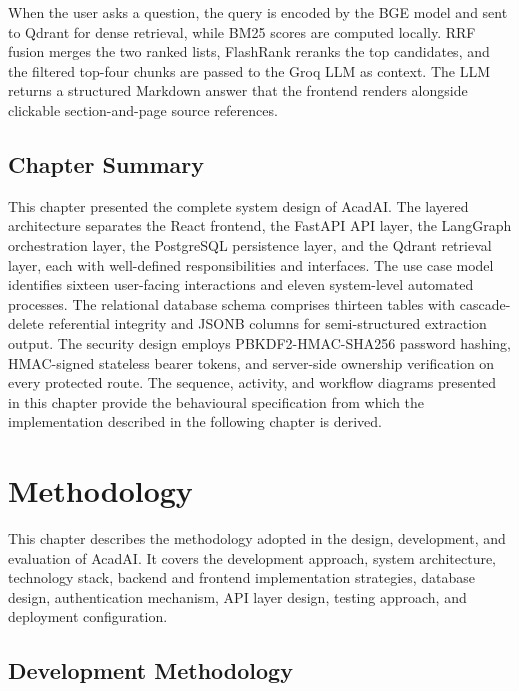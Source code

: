 \documentclass[12pt,a4paper]{report}
\begin{document}
When the user asks a question, the query is encoded by the BGE model and sent
to Qdrant for dense retrieval, while BM25 scores are computed locally. RRF
fusion merges the two ranked lists, FlashRank reranks the top candidates, and
the filtered top-four chunks are passed to the Groq LLM as context. The LLM
returns a structured Markdown answer that the frontend renders alongside
clickable section-and-page source references.

\section{Chapter Summary}

This chapter presented the complete system design of AcadAI. The layered
architecture separates the React frontend, the FastAPI API layer, the LangGraph
orchestration layer, the PostgreSQL persistence layer, and the Qdrant retrieval
layer, each with well-defined responsibilities and interfaces. The use case
model identifies sixteen user-facing interactions and eleven system-level
automated processes. The relational database schema comprises thirteen tables
with cascade-delete referential integrity and JSONB columns for
semi-structured extraction output. The security design employs
PBKDF2-HMAC-SHA256 password hashing, HMAC-signed stateless bearer tokens, and
server-side ownership verification on every protected route. The sequence,
activity, and workflow diagrams presented in this chapter provide the
behavioural specification from which the implementation described in the
following chapter is derived.

\chapter{Methodology}

This chapter describes the methodology adopted in the design, development, and
evaluation of AcadAI. It covers the development approach, system architecture,
technology stack, backend and frontend implementation strategies, database
design, authentication mechanism, API layer design, testing approach, and
deployment configuration.

\section{Development Methodology}
\end{document}
